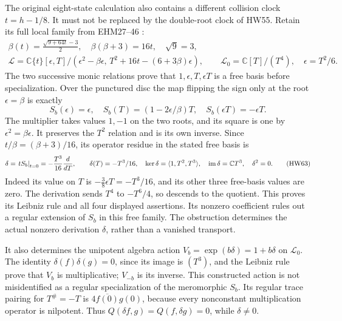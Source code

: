 \documentclass[11pt,a4paper]{article}
\theoremstyle{definition}\newtheorem{definition}[theorem]{Definition}
\newcommand{\C}{\mathbb C}\newcommand{\R}{\mathbb R}
\begin{document}
The original eight-state calculation also contains a different
collision clock \(t=h-1/8\). It must not be replaced by the
double-root clock of HW55. Retain its full local family
from EHM27--46 \cite{HW-EHM}:
\[
 \begin{gathered}
 \beta(t)=\frac{\sqrt{9+64t}-3}{2},\quad
 \beta(\beta+3)=16t,\quad \sqrt{9}=3,\\
 \mathscr L=
 \C\{t\}[\epsilon,T]/
       (\epsilon^2-\beta\epsilon,\,
          T^2+16t-(6+3\beta)\epsilon),\qquad
 \mathscr L_0=\C[T]/(T^4),\quad \epsilon=T^2/6 .
 \end{gathered}
 \tag{HW61}
\]
The two successive monic relations prove that
\(1,\epsilon,T,\epsilon T\) is a free basis before
specialization. Over the punctured disc the map flipping
the sign only at the root \(\epsilon=\beta\) is exactly
\[
 S_b(\epsilon)=\epsilon,\quad
 S_b(T)=(1-2\epsilon/\beta)T,\quad
 S_b(\epsilon T)=-\epsilon T.
 \tag{HW62}
\]
The multiplier takes values \(1,-1\) on the two roots,
and its square is one by \(\epsilon^2=\beta\epsilon\).
It preserves the \(T^2\) relation and is its own inverse.
Since \(t/\beta=(\beta+3)/16\), its operator residue
in the stated free basis is
\[
 \delta=\left.tS_b\right|_{t=0}
     =-\frac{T^3}{16}\frac{d}{dT},\qquad
 \delta(T)=-T^3/16,\quad
 \ker\delta=\langle1,T^2,T^3\rangle,\quad
 \im\delta=\C T^3,\quad \delta^2=0.
 \tag{HW63}
\]
Indeed its value on \(T\) is
\(-\frac38\epsilon T=-T^3/16\), and its other three
free-basis values are zero. The derivation sends \(T^4\)
to \(-T^6/4\), so descends to the quotient. This proves
its Leibniz rule and all four displayed assertions.
Its nonzero coefficient rules out a regular extension
of \(S_b\) in this free family. The obstruction determines
the actual nonzero derivation \(\delta\), rather than a
vanished transport.

It also determines the unipotent algebra action
\(V_b=\exp(b\delta)=1+b\delta\) on \(\mathscr L_0\).
The identity
\(\delta(f)\delta(g)=0\), since its image is \((T^3)\),
and the Leibniz rule prove that \(V_b\) is multiplicative;
\(V_{-b}\) is its inverse. This constructed action is not
misidentified as a regular specialization of the
meromorphic \(S_b\).
Its regular trace pairing for \(T^\#=-T\) is
\(4\overline{f(0)}g(0)\), because every nonconstant
multiplication operator is nilpotent. Thus
\(Q(\delta f,g)=Q(f,\delta g)=0\), while \(\delta\ne0\).
\end{document}
